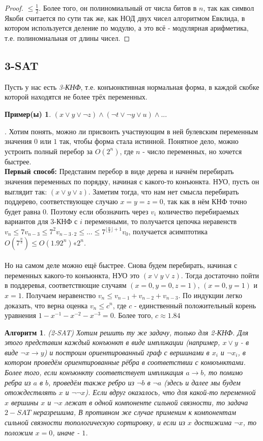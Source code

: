 \documentclass[a4paper]{article}
\theoremstyle{indented}
\newtheorem{alg}{Алгоритм}
\theoremstyle{definition}
\newtheorem{exl}{Пример(ы)}
\theoremstyle{remark}
\DeclareMathOperator{\ra}{\rightarrow}
\begin{document}
\begin{proof}
$\leq \frac{1}{2}$. Более того, он полиномиальный от числа битов в $n$, так как символ Якоби считается по сути так же, как НОД двух чисел алгоритмом Евклида, в котором используется деление по модулю, а это всё - модулярная арифметика, т.е. полиномиальная от длины чисел.
\end{proof}
\subsection{3-SAT}
Пусть у нас есть \textit{3-КНФ}, т.е. конъюнктивная нормальная форма, в каждой скобке которой находятся не более трёх переменных.
\begin{exl}
$(x \vee y \vee \neg z) \wedge (\neg t \vee \neg y \vee u) \wedge ...$
\end{exl}.
Хотим понять, можно ли присвоить участвующим в ней булевским переменным значения $0$ или $1$ так, чтобы форма стала истинной. Понятное дело, можно устроить полный перебор за $O(2^n)$, где $n$ - число переменных, но хочется быстрее.
\\
\textbf{Первый способ:} Представим перебор в виде дерева и начнём перебирать значения переменных по порядку, начиная с какого-то конъюнкта. НУО, пусть он выглядит так: $(x \vee y \vee z)$. Заметим тогда, что нам нет смысла перебирать поддерево, соответствующее случаю $x=y=z=0$, так как в нём КНФ точно будет равна $0$. Поэтому если обозначить через $v_i$ количество перебираемых вариантов для 3-КНФ с $i$ переменными, то получается цепочка неравенств $v_n \leq 7v_{n-3} \leq 7^2v_{n-3 \cdot 2} \leq ... \leq 7^{\lfloor \frac{n}{3} \rfloor +1}v_0$, получается асимптотика $O(7^{\frac{n}{3}}) \leq O(1.92^n) « 2^n$. 
\\
\\
Но на самом деле можно ещё быстрее. Снова будем перебирать, начиная с переменных какого-то конъюнкта, НУО это $(x \vee y \vee z)$. Тогда достаточно пойти в поддеревья, соответствющие случаям $(x=0, y=0, z=1)$, $(x=0, y=1)$ и $x=1$. Получаем неравенство $v_n \leq v_{n-1}+v_{n-2}+v_{n-3}$. По индукции легко доказать, что верна оценка $v_n \leq c^n$, где $c$ - единственный положительный корень уравнения $1-x^{-1}-x^{-2}-x^{-3}=0$. Более того, $c \approx 1.84$
\begin{alg}
(2-SAT) Хотим решить ту же задачу, только для 2-КНФ. Для этого представим каждый конъюнкт в виде импликации (например, $x \vee y$ - в виде $\neg x \ra y$) и построим ориентированный граф с вершинами в $x_i$ и $ \neg x_i$, в котором проведём ориентированные рёбра в соответствии с конюънктами. Более того, если конъюнкту соответствует импликация $a \ra b$, то помимо ребра из $a$ в $b$, проведём также ребро из $\neg b$ в $\neg a$ (здесь и далее мы будем отождествлять $x$ и $\neg \neg x$). Если вдруг оказалось, что для какой-то переменной $x$ вершины $x$ и $\neg x$ лежат в одной компоненте сильной связности, то задача $2-SAT$ неразрешима, В противном же случае применим к компонентам сильной связности топологическую сортировку, и если из $x$ достижима $\neg x$, то положим $x=0$, иначе - $1$. 
\end{alg}
\end{document}

